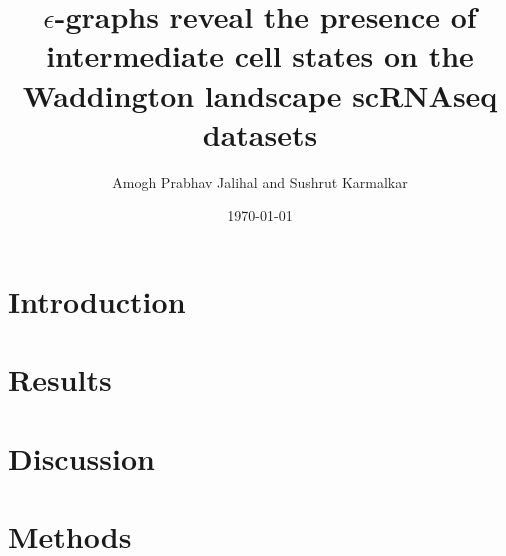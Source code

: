 \documentclass[11pt]{article}
\author{Amogh Prabhav Jalihal and Sushrut Karmalkar}
\date{\today}
\title{\(\epsilon\)-graphs reveal the presence of intermediate cell states on the Waddington landscape scRNAseq datasets}
\begin{document}
\maketitle
\tableofcontents

\section{Introduction}
\label{sec:org5e88046}
\section{Results}
\label{sec:org7164ab1}
\section{Discussion}
\label{sec:org6b7146d}
\section{Methods}
\label{sec:org233c45e}
\end{document}
